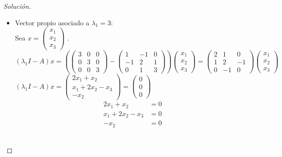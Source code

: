 \documentclass[12pt]{book}
\newenvironment{solucion}
  {\renewcommand\qedsymbol{$\square$}\begin{proof}[Solución]}
  {\end{proof}}
\begin{document}
\begin{solucion}
\begin{itemize}
    \item Vector propio asociado a $\lambda_1=3$:\\
        Sea $x=\begin{pmatrix}
        x_1\\
        x_2\\
        x_3
        \end{pmatrix}$ .\\
        $(\lambda_1I-A)x=\left(\begin{pmatrix}
        3 & 0 & 0\\
        0 & 3 & 0\\
        0 & 0 & 3
        \end{pmatrix} - \begin{pmatrix}
        1 & -1 & 0\\
        -1 & 2 & 1\\
        0 & 1 & 3
        \end{pmatrix}\right) \begin{pmatrix}
        x_1\\
        x_2\\
        x_3
        \end{pmatrix}=\begin{pmatrix}
        2 & 1 & 0\\
        1 & 2 & -1\\
        0 & -1 & 0
        \end{pmatrix}\begin{pmatrix}
        x_1\\
        x_2\\
        x_3
        \end{pmatrix}$\\
        $(\lambda_1I-A)x=\begin{pmatrix}
        2x_1+x_2\\
        x_1+2x_2-x_3\\
        -x_2
        \end{pmatrix}=\begin{pmatrix}
        0\\
        0\\
        0
        \end{pmatrix}$\\
        \begin{align*}
            2x_1+x_2&=0\\
            x_1+2x_2-x_3&=0\\
            -x_2&=0
        \end{align*} \\

\end{itemize}
\end{solucion}
\end{document}
